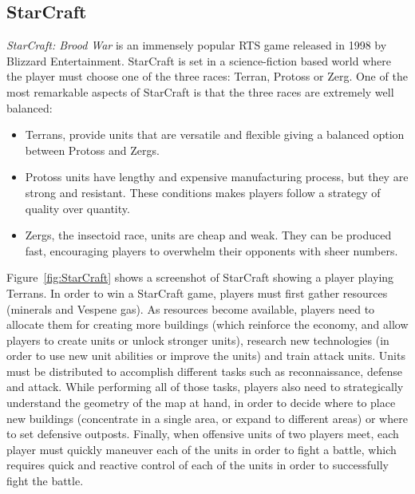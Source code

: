 \documentclass[journal]{IEEEtran}
\begin{document}
\subsection{StarCraft}\label{subsec:StarCraft}

{\em StarCraft: Brood War} is an immensely popular RTS game released in 1998 by Blizzard Entertainment. StarCraft is set in a science-fiction based world where the player must choose one of the three races: Terran, Protoss or Zerg. One of the most remarkable aspects of StarCraft is that the three races are extremely well balanced:

\begin{itemize}
	\item Terrans, provide units that are versatile and flexible giving a balanced option between Protoss and Zergs.
	\item Protoss units have lengthy and expensive manufacturing process, but they are strong and resistant. These conditions makes players follow a strategy of quality over quantity.
	\item Zergs, the insectoid race, units are cheap and weak. They can be produced fast, encouraging players to overwhelm their opponents with sheer numbers.
\end{itemize}


Figure~\ref{fig:StarCraft} shows a screenshot of StarCraft showing a player playing Terrans. In order to win a StarCraft game, players must first gather resources (minerals and Vespene gas). As resources become available, players need to allocate them for creating more buildings (which reinforce the economy, and allow players to create units or unlock stronger units), research new technologies (in order to use new unit abilities or improve the units) and train attack units. Units must be distributed to accomplish different tasks such as reconnaissance, defense and attack. While performing all of those tasks, players also need to strategically understand the geometry of the map at hand, in order to decide where to place new buildings (concentrate in a single area, or expand to different areas) or where to set defensive outposts. Finally, when offensive units of two players meet, each player must quickly maneuver each of the units in order to fight a battle, which requires quick and reactive control of each of the units in order to successfully fight the battle. 
\end{document}
